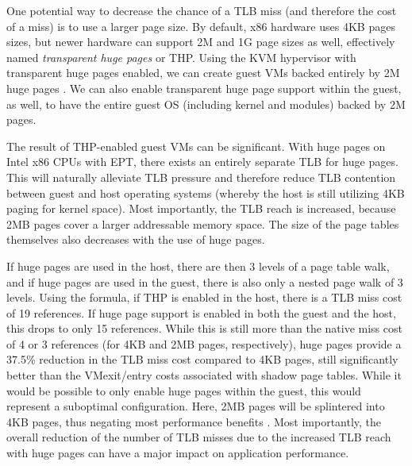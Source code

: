 One potential way to decrease the chance of a TLB miss (and therefore the cost of a miss) is to use a larger page size. By default, x86 hardware uses 4KB pages sizes, but newer hardware can support 2M and 1G page sizes as well, effectively named \emph{transparent huge pages} or THP.  Using the KVM hypervisor with transparent huge pages enabled, we can create guest VMs backed entirely by 2M huge pages \cite{Arcangeli:2010}. We can also enable transparent huge page support within the guest, as well, to have the entire guest OS (including kernel and modules) backed by 2M pages. 

The result of THP-enabled guest VMs can be significant. With huge pages on Intel x86 CPUs with EPT, there exists an entirely separate TLB for huge pages. This will naturally alleviate TLB pressure and therefore reduce TLB contention between guest and host operating systems (whereby the host is still utilizing 4KB paging for kernel space). Most importantly, the TLB reach is increased, because 2MB pages cover a larger addressable memory space.  The size of the page tables themselves also decreases with the use of huge pages.  

If huge pages are used in the host, there are then 3 levels of a page table walk, and if huge pages are used in the guest, there is also only a nested page walk of 3 levels. Using the formula, if THP is enabled in the host, there is a TLB miss cost of 19 references.  If huge page support is enabled in both the guest and the host, this drops to only 15 references.  While this is still more than the native miss cost of 4 or 3 references (for 4KB and 2MB pages, respectively), huge pages provide a 37.5\% reduction in the TLB miss cost compared to 4KB pages, still significantly better than the VMexit/entry costs associated with shadow page tables.  While it would be possible to only enable huge pages within the guest, this would represent a suboptimal configuration. Here, 2MB pages will be splintered into 4KB pages, thus negating most performance benefits \cite{pham2015splintering}.  Most importantly, the overall reduction of the number of TLB misses due to the increased TLB reach with huge pages can have a major impact on application performance.  


